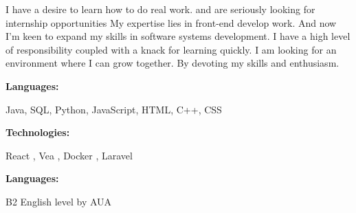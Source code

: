 \documentclass[9pt]{developercv} %
\begin{document}
\begin{minipage}[t]{0.46\textwidth}
\vspace{ -10 pt}
	\vspace{ -7 pt}
 
	I have a desire to learn how to do real work. and are seriously looking for internship opportunities My expertise lies in front-end develop work. And now I'm keen to expand my skills in software systems development. I have a high level of responsibility coupled with a knack for learning quickly. I am looking for an environment where I can grow together. By devoting my skills and enthusiasm.
\end{minipage}
\hfill %
\begin{minipage}[t]{0.465\textwidth}
    \vspace{-6pt}
    
    \begin{minipage}[t]{0.2\textwidth}
        \textbf{Languages:}
    \end{minipage}
    \hfill
    \begin{minipage}[t]{0.7\textwidth}
      Java, SQL, Python, JavaScript, HTML, C++, CSS  
    \end{minipage}
    \vspace{4mm}
    
    \begin{minipage}[t]{0.2\textwidth}
        \textbf{Technologies:}
    \end{minipage}
    \hfill
    \begin{minipage}[t]{0.7\textwidth}
      React , Vea , Docker , Laravel
    \end{minipage}
    \vspace{4mm}

      \begin{minipage}[t]{0.2\textwidth}
        \textbf{Languages:}
    \end{minipage}
    \hfill
    \begin{minipage}[t]{0.7\textwidth}
      B2 English level by AUA
    \end{minipage}
    
\end{minipage}
\end{document}
